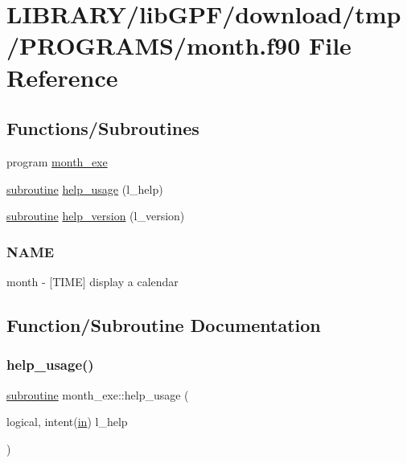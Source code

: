 \hypertarget{month_8f90}{}\section{L\+I\+B\+R\+A\+R\+Y/lib\+G\+P\+F/download/tmp/\+P\+R\+O\+G\+R\+A\+M\+S/month.f90 File Reference}
\label{month_8f90}
\subsection*{Functions/\+Subroutines}
\begin{DoxyCompactItemize}
\item 
program \hyperlink{month_8f90_a25f7e0d0c91977505b956237e747f2bb}{month\+\_\+exe}
\item 
\hyperlink{M__stopwatch_83_8txt_acfbcff50169d691ff02d4a123ed70482}{subroutine} \hyperlink{month_8f90_a59e45312af3c1c4bda229af348aaac1b}{help\+\_\+usage} (l\+\_\+help)
\item 
\hyperlink{M__stopwatch_83_8txt_acfbcff50169d691ff02d4a123ed70482}{subroutine} \hyperlink{month_8f90_ae30c982fccb720f9edefdd837baed72a}{help\+\_\+version} (l\+\_\+version)
\begin{DoxyCompactList}\small\item\em \subsubsection*{N\+A\+ME}

month -\/ \mbox{[}T\+I\+ME\mbox{]} display a calendar \end{DoxyCompactList}\end{DoxyCompactItemize}


\subsection{Function/\+Subroutine Documentation}
\mbox{\label{month_8f90_a59e45312af3c1c4bda229af348aaac1b}} 
\subsubsection{\texorpdfstring{help\+\_\+usage()}{help\_usage()}}
{\footnotesize\ttfamily \hyperlink{M__stopwatch_83_8txt_acfbcff50169d691ff02d4a123ed70482}{subroutine} month\+\_\+exe\+::help\+\_\+usage (\begin{DoxyParamCaption}\item[{logical, intent(\hyperlink{M__journal_83_8txt_afce72651d1eed785a2132bee863b2f38}{in})}]{l\+\_\+help }\end{DoxyParamCaption})}



